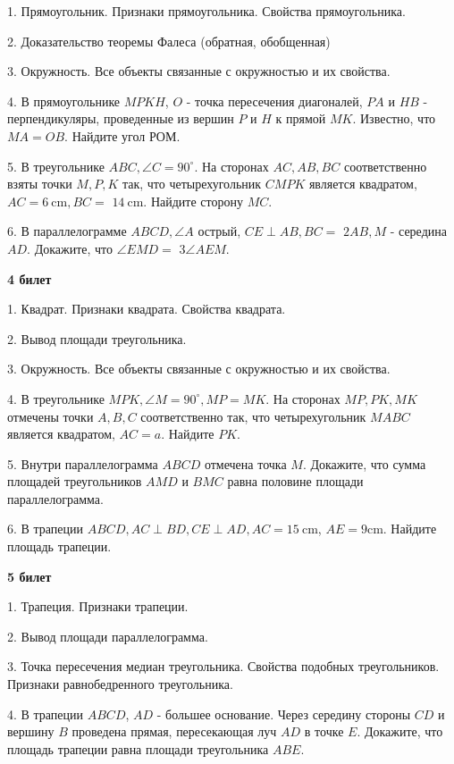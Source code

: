 1. Прямоугольник. Признаки прямоугольника. Свойства прямоугольника.

2. Доказательство теоремы Фалеса (обратная, обобщенная)

3. Окружность. Все объекты связанные с окружностью и их свойства.

4. В прямоугольнике $MPKH$, $O$ - точка пересечения диагоналей, $PA$ и $H B$ - перпендикуляры, проведенные из вершин $P$ и $H$ к прямой $M K$. Известно, что $M A=O B$. Найдите угол РОМ.

5. В треугольнике $A B C, \angle C=90^{\circ}$. На сторонах $A C, A B, B C$ соответственно взяты точки $M, P, K$ так, что четырехугольник $C M P K$ является квадратом, $A C=6 \mathrm{~cm}, B C=$ $14 \mathrm{~cm}$. Найдите сторону $MC$.


6. В параллелограмме $A B C D ,\angle A$ острый, $C E \perp A B, B C=$ $2 A B, M$ - середина $A D$. Докажите, что $\angle E M D=$ $3 \angle A E M$.





\centerline{\bf \Huge }
\centerline{\bf \Huge 4 билет}
\centerline{\bf \Huge }

1. Квадрат. Признаки квадрата. Свойства квадрата.

2. Вывод площади треугольника.

3. Окружность. Все объекты связанные с окружностью и их свойства.

4. В треугольнике $M P K, \angle M=90^{\circ}, M P=M K$. На сторонах $M P, P K, M K$ отмечены точки $A, B, C$ соответственно так, что четырехугольник $M A B C$ является квадратом, $A C=a$. Найдите $P K$.

5. Внутри параллелограмма $A B C D$ отмечена точка $M$. Докажите, что сумма площадей треугольников $A M D$ и $BMC$ равна половине площади параллелограмма.

6. В трапеции $A B C D, A C \perp B D, C E \perp A D, A C=15 \mathrm{~cm}$, $A E=9 \mathrm{cm}$. Найдите площадь трапеции.


\newpage
\centerline{\bf \Huge }
\centerline{\bf \Huge 5 билет}
\centerline{\bf \Huge }

1. Трапеция. Признаки трапеции. 

2. Вывод площади параллелограмма.

3. Точка пересечения медиан треугольника. Свойства подобных треугольников. Признаки равнобедренного треугольника. 

4. В трапеции $A B C D$, $AD$ - большее основание. Через середину стороны $C D$ и вершину $B$ проведена прямая, пересекающая луч $A D$ в точке $E$. Докажите, что площадь трапеции равна площади треугольника $A B E$.

